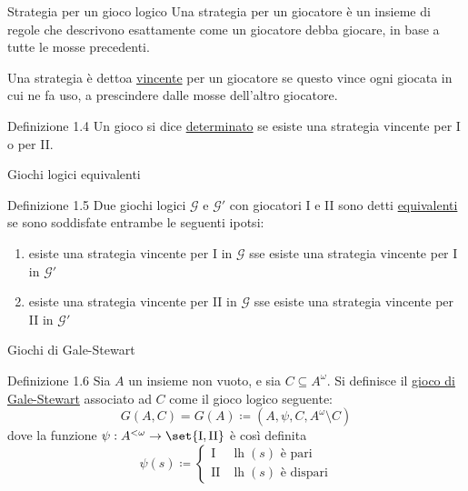 \documentclass[babel]{beamer}
\renewcommand{\href}[2]{#2}
\begin{document}
\begin{frame}[label={sec:orgaa22a57}]{Strategia per un gioco logico}
Una strategia per un giocatore è un insieme di regole che descrivono esattamente come un giocatore debba giocare, in base a tutte le mosse precedenti.

Una strategia è dettoa \uline{vincente} per un giocatore se questo vince ogni giocata in cui ne fa uso, a prescindere dalle mosse dell'altro giocatore.
\begin{block}{Definizione 1.4}
Un gioco si dice \uline{determinato} se esiste una strategia vincente per I o per II.
\end{block}
\end{frame}
\begin{frame}[label={sec:org84dbf4e}]{Giochi logici equivalenti}
\begin{block}{Definizione 1.5}
Due \href{../../../../../../../org/roam/20250513155732-logic_game.org}{giochi logici} \(\mathcal{G}\) e \(\mathcal{G'}\) con giocatori I e II sono detti \uline{equivalenti} se sono soddisfate entrambe le seguenti ipotsi:
\begin{enumerate}
\item esiste una \href{../../../../../../../org/roam/20250513155732-logic_game.org}{strategia vincente} per I in \(\mathcal{G}\) sse esiste una \href{../../../../../../../org/roam/20250513155732-logic_game.org}{strategia vincente} per I in \(\mathcal{G}'\)
\item esiste una \href{../../../../../../../org/roam/20250513155732-logic_game.org}{strategia vincente} per II in \(\mathcal{G}\) sse esiste una \href{../../../../../../../org/roam/20250513155732-logic_game.org}{strategia vincente} per II in \(\mathcal{G}'\)
\end{enumerate}
\end{block}
\end{frame}
\begin{frame}[label={sec:org6590236}]{Giochi di Gale-Stewart}
\begin{block}{Definizione 1.6}
Sia \(A\) un \href{../../../../../../../org/roam/20250130104331-insieme_mk.org}{insieme} non vuoto, e sia \(C \subseteq A^{\omega}\). Si definisce il \uline{gioco di Gale-Stewart} associato ad \(C\) come il \href{../../../../../../../org/roam/20250513155732-logic_game.org}{gioco logico} seguente:
\begin{equation*}
G(A,C) = G(A) \coloneqq (A, \psi, C, A^{\omega}\setminus C)
\end{equation*}
dove la \href{../../../../../../../org/roam/20250202170607-classe_relazione_binaria.org}{funzione} \(\psi: A^{<\omega}\to \set{\text{I},\text{II}}\) è così definita
\begin{equation*}
\psi(s) \coloneqq \begin{cases}
\text{I} & \operatorname{lh}(s)\text{ è pari}\\
\text{II} & \operatorname{lh}(s)\text{ è dispari}
\end{cases}
\end{equation*}
\end{block}
\end{frame}
\end{document}
